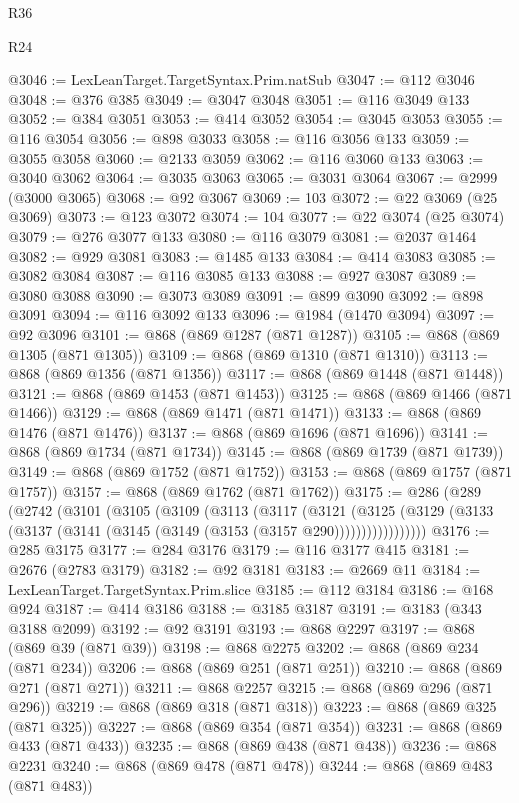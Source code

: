 \begin{lexlean}{R36}
\begin{lexlean}{R24}
\begin{coremodule}
{{{{{{{{{{{{{{{{{{{{{{{{{{{{{{{{{{{{{{{{{{{{{{{{{{{{{{{{{{{{{{{{{{{{{{{{{{{{{{{{{{{{{{{{{{{{{{{{{{{{{{{{{{{{{{{{{{{{{{{{{{{{{{{{{{{{{{{{{{{{{{{{{{{{{{{{{{{{{{{{{{{{{{{{{{{{{{{{{{{{{{{{{{{{{{{{{{{@3046 := LexLeanTarget.TargetSyntax.Prim.natSub
@3047 := @112 @3046
@3048 := @376 @385
@3049 := @3047 @3048
@3051 := @116 @3049 @133
@3052 := @384 @3051
@3053 := @414 @3052
@3054 := @3045 @3053
@3055 := @116 @3054
@3056 := @898 @3033
@3058 := @116 @3056 @133
@3059 := @3055 @3058
@3060 := @2133 @3059
@3062 := @116 @3060 @133
@3063 := @3040 @3062
@3064 := @3035 @3063
@3065 := @3031 @3064
@3067 := @2999 (@3000 @3065)
@3068 := @92 @3067
@3069 := 103
@3072 := @22 @3069 (@25 @3069)
@3073 := @123 @3072
@3074 := 104
@3077 := @22 @3074 (@25 @3074)
@3079 := @276 @3077 @133
@3080 := @116 @3079
@3081 := @2037 @1464
@3082 := @929 @3081
@3083 := @1485 @133
@3084 := @414 @3083
@3085 := @3082 @3084
@3087 := @116 @3085 @133
@3088 := @927 @3087
@3089 := @3080 @3088
@3090 := @3073 @3089
@3091 := @899 @3090
@3092 := @898 @3091
@3094 := @116 @3092 @133
@3096 := @1984 (@1470 @3094)
@3097 := @92 @3096
@3101 := @868 (@869 @1287 (@871 @1287))
@3105 := @868 (@869 @1305 (@871 @1305))
@3109 := @868 (@869 @1310 (@871 @1310))
@3113 := @868 (@869 @1356 (@871 @1356))
@3117 := @868 (@869 @1448 (@871 @1448))
@3121 := @868 (@869 @1453 (@871 @1453))
@3125 := @868 (@869 @1466 (@871 @1466))
@3129 := @868 (@869 @1471 (@871 @1471))
@3133 := @868 (@869 @1476 (@871 @1476))
@3137 := @868 (@869 @1696 (@871 @1696))
@3141 := @868 (@869 @1734 (@871 @1734))
@3145 := @868 (@869 @1739 (@871 @1739))
@3149 := @868 (@869 @1752 (@871 @1752))
@3153 := @868 (@869 @1757 (@871 @1757))
@3157 := @868 (@869 @1762 (@871 @1762))
@3175 := @286
    (@289
      (@2742
        (@3101
          (@3105
            (@3109
              (@3113
                (@3117
                  (@3121
                    (@3125
                      (@3129 (@3133 (@3137 (@3141 (@3145 (@3149 (@3153 (@3157 @290)))))))))))))))))
@3176 := @285 @3175
@3177 := @284 @3176
@3179 := @116 @3177 @415
@3181 := @2676 (@2783 @3179)
@3182 := @92 @3181
@3183 := @2669 @11
@3184 := LexLeanTarget.TargetSyntax.Prim.slice
@3185 := @112 @3184
@3186 := @168 @924
@3187 := @414 @3186
@3188 := @3185 @3187
@3191 := @3183 (@343 @3188 @2099)
@3192 := @92 @3191
@3193 := @868 @2297
@3197 := @868 (@869 @39 (@871 @39))
@3198 := @868 @2275
@3202 := @868 (@869 @234 (@871 @234))
@3206 := @868 (@869 @251 (@871 @251))
@3210 := @868 (@869 @271 (@871 @271))
@3211 := @868 @2257
@3215 := @868 (@869 @296 (@871 @296))
@3219 := @868 (@869 @318 (@871 @318))
@3223 := @868 (@869 @325 (@871 @325))
@3227 := @868 (@869 @354 (@871 @354))
@3231 := @868 (@869 @433 (@871 @433))
@3235 := @868 (@869 @438 (@871 @438))
@3236 := @868 @2231
@3240 := @868 (@869 @478 (@871 @478))
@3244 := @868 (@869 @483 (@871 @483))
}}}}}}}}}}}}}}}}}}}}}}}}}}}}}}}}}}}}}}}}}}}}}}}}}}}}}}}}}}}}}}}}}}}}}}}}}}}}}}}}}}}}}}}}}}}}}}}}}}}}}}}}}}}}}}}}}}}}}}}}}}}}}}}}}}}}}}}}}}}}}}}}}}}}}}}}}}}}}}}}}}}}}}}}}}}}}}}}}}}}}}}}}}}}}}}}}}}
\end{coremodule}
\end{lexlean}
\end{lexlean}

